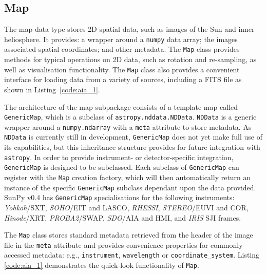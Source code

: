 \subsection{Map}\label{ssec:map}
The map data type stores 2D spatial data, such as images of the Sun and 
inner heliosphere. It provides: a wrapper around a \texttt{numpy} data array; 
the images associated spatial coordinates; and other metadata. The \texttt{Map} 
class provides methods for typical operations on 2D data, such as rotation and 
re-sampling, as well as visualisation functionality.
The \texttt{Map} class also provides a convenient interface for loading data 
from a variety of sources, including a FITS file as shown in 
Listing~\ref{code:aia_1}.

The architecture of the map subpackage consists of a template map called
\texttt{GenericMap}, which is a subclass of \texttt{astropy.nddata.NDData}. 
\texttt{NDData} is a generic wrapper around a \texttt{numpy.ndarray} with a 
\texttt{meta} attribute to store metadata.
As \texttt{NDData} is currently still in development, \texttt{GenericMap} does 
not yet make full use of its capabilities, but this inheritance structure 
provides for future integration with \texttt{astropy}. In order to provide 
instrument- or detector-specific integration, \texttt{GenericMap} is designed
to be subclassed. Each subclass of \texttt{GenericMap} can register 
with the \texttt{Map} creation factory, which will then automatically return an instance
of the specific \texttt{GenericMap} subclass dependant upon the data provided. 
SunPy v0.4 has \texttt{GenericMap} specialisations for the following 
instruments: 
\textit{Yohkoh}/SXT, \textit{SOHO}/EIT and LASCO, \textit{RHESSI}, 
\textit{STEREO}/EUVI and COR, \textit{Hinode}/XRT,
\textit{PROBA2}/SWAP, \textit{SDO}/AIA and HMI, 
and \textit{IRIS} SJI frames. 

The \texttt{Map} class stores standard metadata retrieved from the header of 
the image file in the \texttt{meta} attribute and provides convenience 
properties for commonly accessed metadata: e.g., \texttt{instrument}, 
\texttt{wavelength} or \texttt{coordinate\_system}. 
Listing \ref{code:aia_1} demonstrates the quick-look functionality of 
\texttt{Map}.

